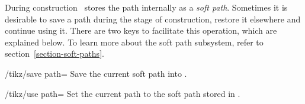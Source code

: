 During construction \tikzname\ stores the path internally as a \emph{soft
path}. Sometimes it is desirable to save a path during the stage of
construction, restore it elsewhere and continue using it. There are two keys to
facilitate this operation, which are explained below. To learn more about the
soft path subsystem, refer to section~\ref{section-soft-paths}.

\begin{key}{/tikz/save path=}
    Save the current soft path into .
\end{key}

\begin{key}{/tikz/use path=}
    Set the current path to the soft path stored in .
\end{key}

\begin{codeexample}[preamble={\usetikzlibrary{intersections}}]
\end{codeexample}
